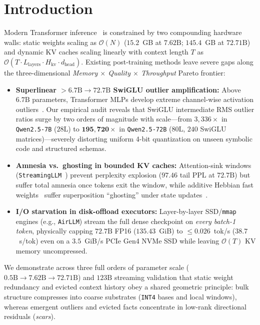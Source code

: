 \documentclass[10pt,twocolumn]{article}
\begin{document}
\section{Introduction}
Modern Transformer inference~\citep{vaswani2017attention} is constrained by two compounding hardware walls: static weights scaling as $\mathcal{O}(N)$ ($15.2$~GB at $7.62\text{B}$; $145.4$~GB at $72.71\text{B}$) and dynamic KV caches scaling linearly with context length $T$ as $\mathcal{O}(T \cdot L_{\text{layers}} \cdot H_{\text{kv}} \cdot d_{\text{head}})$. Existing post-training methods leave severe gaps along the three-dimensional \emph{Memory $\times$ Quality $\times$ Throughput} Pareto frontier:
\begin{itemize}
    \item \textbf{Superlinear $>6.7\text{B} \to 72.7\text{B}$ SwiGLU outlier amplification:} Above $6.7\text{B}$ parameters, Transformer MLPs develop extreme channel-wise activation outliers~\citep{dettmers2022llmint8,lin2024awq}. Our empirical audit reveals that SwiGLU intermediate RMS outlier ratios surge by two orders of magnitude with scale---from $3{,}336\times$ in \texttt{Qwen2.5-7B} ($28\text{L}$) to $\mathbf{195{,}720\times}$ in \texttt{Qwen2.5-72B} ($80\text{L}$, $240$ SwiGLU matrices)---severely distorting uniform 4-bit quantization on unseen symbolic code and structured schemas.
    \item \textbf{Amnesia vs.\ ghosting in bounded KV caches:} Attention-sink windows (\texttt{StreamingLLM}~\citep{xiao2024efficient}) prevent perplexity explosion ($97.46$ tail PPL at $72.7\text{B}$) but suffer total amnesia once tokens exit the window, while additive Hebbian fast weights~\citep{schmidhuber1992learning} suffer superposition ``ghosting'' under state updates~\citep{schlag2021linear,yang2024parallelizing}.
    \item \textbf{I/O starvation in disk-offload executors:} Layer-by-layer SSD/\texttt{mmap} engines (e.g., \texttt{AirLLM}) stream the full dense checkpoint on \emph{every batch-1 token}, physically capping $72.7\text{B}$ FP16 ($135.43$~GiB) to $\le 0.026$~tok/s ($38.7$~s/tok) even on a $3.5$~GiB/s PCIe Gen4 NVMe SSD while leaving $\mathcal{O}(T)$ KV memory uncompressed.
\end{itemize}

We demonstrate across three full orders of parameter scale ($0.5\text{B} \to 7.62\text{B} \to 72.71\text{B}$) and $123\text{B}$ streaming validation that static weight redundancy and evicted context history obey a shared geometric principle: bulk structure compresses into coarse substrates (\texttt{INT4} bases and local windows), whereas emergent outliers and evicted facts concentrate in low-rank directional residuals (\emph{scars}).
\end{document}
